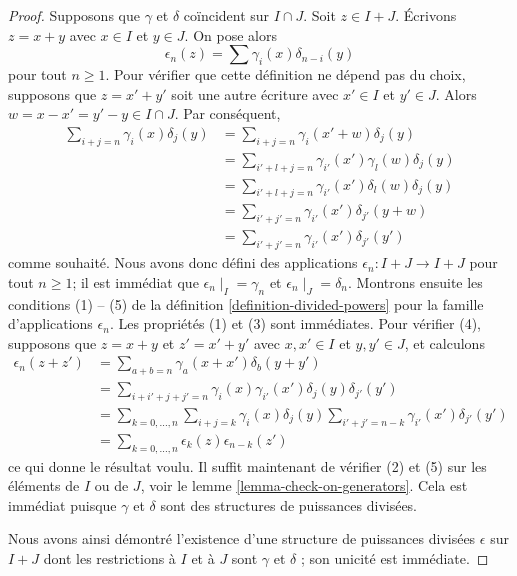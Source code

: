 \begin{proof}
\medskip\noindent
Supposons que $\gamma$ et $\delta$ coïncident sur $I \cap J$.
Soit $z \in I + J$. Écrivons $z = x + y$ avec $x \in I$ et $y \in J$.
On pose alors
$$
\epsilon_n(z) = \sum\gamma_i(x)\delta_{n - i}(y)
$$
pour tout $n \geq 1$.
Pour vérifier que cette définition ne dépend pas du choix, supposons que $z = x' + y'$ soit une
autre écriture avec $x' \in I$ et $y' \in J$. Alors
$w = x - x' = y' - y \in I \cap J$. Par conséquent,
\begin{align*}
\sum\nolimits_{i + j = n} \gamma_i(x)\delta_j(y)
& =
\sum\nolimits_{i + j = n} \gamma_i(x' + w)\delta_j(y) \\
& =
\sum\nolimits_{i' + l + j = n} \gamma_{i'}(x')\gamma_l(w)\delta_j(y) \\
& =
\sum\nolimits_{i' + l + j = n} \gamma_{i'}(x')\delta_l(w)\delta_j(y) \\
& =
\sum\nolimits_{i' + j' = n} \gamma_{i'}(x')\delta_{j'}(y + w) \\
& =
\sum\nolimits_{i' + j' = n} \gamma_{i'}(x')\delta_{j'}(y')
\end{align*}
comme souhaité. Nous avons donc défini des applications
$\epsilon_n : I + J \to I + J$ pour tout $n \geq 1$; il est
immédiat que $\epsilon_n \mid_{I} = \gamma_n$ et
$\epsilon_n \mid_{J} = \delta_n$.
Montrons ensuite les conditions (1) -- (5) de
la définition \ref{definition-divided-powers} pour la famille
d'applications $\epsilon_n$.
Les propriétés (1) et (3) sont immédiates. Pour vérifier (4),
supposons que $z = x + y$ et $z' = x' + y'$ avec $x, x' \in I$ et $y, y' \in J$,
et calculons
\begin{align*}
\epsilon_n(z + z') & =
\sum\nolimits_{a + b = n} \gamma_a(x + x')\delta_b(y + y') \\
& =
\sum\nolimits_{i + i' + j + j' = n}
\gamma_i(x) \gamma_{i'}(x')\delta_j(y)\delta_{j'}(y') \\
& =
\sum\nolimits_{k = 0, \ldots, n}
\sum\nolimits_{i+j=k} \gamma_i(x)\delta_j(y)
\sum\nolimits_{i'+j'=n-k} \gamma_{i'}(x')\delta_{j'}(y') \\
& =
\sum\nolimits_{k = 0, \ldots, n}\epsilon_k(z)\epsilon_{n-k}(z')
\end{align*}
ce qui donne le résultat voulu. Il suffit maintenant de vérifier (2) et (5) sur
les éléments de $I$ ou de $J$, voir le lemme \ref{lemma-check-on-generators}.
Cela est immédiat puisque $\gamma$ et $\delta$ sont des structures de
puissances divisées.

\medskip\noindent
Nous avons ainsi démontré l'existence d'une structure de puissances divisées $\epsilon$ sur $I+J$
dont les restrictions à $I$ et à $J$ sont $\gamma$ et $\delta$ ;
son unicité est immédiate.
\end{proof}

